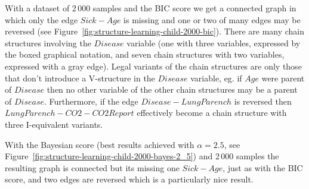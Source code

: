 \documentclass[english,cover]{fitthesis} %
\begin{document}
With a dataset of 2\,000 samples and the BIC score we get a connected graph in which only the edge $Sick - Age$ is missing and one or two of many edges may be reversed (see Figure~\ref{fig:structure-learning-child-2000-bic}). There are many chain structures involving the $Disease$ variable (one with three variables, expressed by the boxed graphical notation, and seven chain structures with two variables, expressed with a gray edge). Legal variants of the chain structures are only those that don't introduce a V-structure in the $Disease$ variable, eg. if $Age$ were parent of $Disease$ then no other variable of the other chain structures may be a parent of $Disease$. Furthermore, if the edge $Disease - LungParench$ is reversed then $LungParench - CO2 - CO2Report$ effectively become a chain structure with three I-equivalent variants.

With the Bayesian score (best results achieved with $\alpha=2.5$, see Figure~\ref{fig:structure-learning-child-2000-bayes-2_5}) and 2\,000 samples the resulting graph is connected but its missing one $Sick - Age$, just as with the BIC score, and two edges are reversed which is a particularly nice result.
\end{document}
